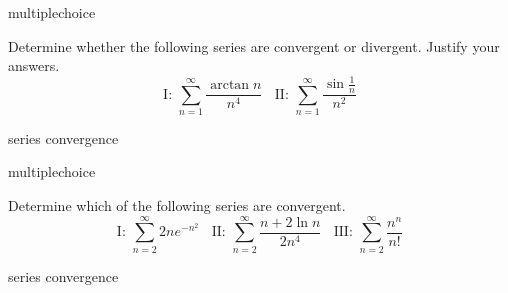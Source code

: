\documentclass{ximera}
\begin{document}
\begin{question}[2016C.10]
\begin{type}
multiplechoice
\end{type}
Determine whether the following series are convergent or divergent. Justify your answers.
\[ \text{I: } \sum_{n=1}^\infty \frac{\arctan n}{n^4} \ \ \ \ \text{II: } \sum_{n=1}^\infty \frac{\sin \frac{1}{n}}{n^2} \]
\begin{multiplechoice}
 \choicebreak
{}
\end{multiplechoice}
\begin{keywords}
series convergence
\end{keywords}
\end{question}

\begin{question}[2017C.11]
\begin{type}
multiplechoice
\end{type}
Determine which of the following series are convergent. 
\[ \text{I: } \sum_{n=2}^\infty 2ne^{-n^2} \ \ \ \ \text{II: } \sum_{n=2}^\infty \frac{n + 2 \ln n}{2 n^4} \ \ \ \ \text{III: } \sum_{n=2}^\infty \frac{n^n}{n!} \]
\begin{multiplechoice}
\end{multiplechoice}
\begin{keywords}
series convergence
\end{keywords}
\end{question}
\end{document}
